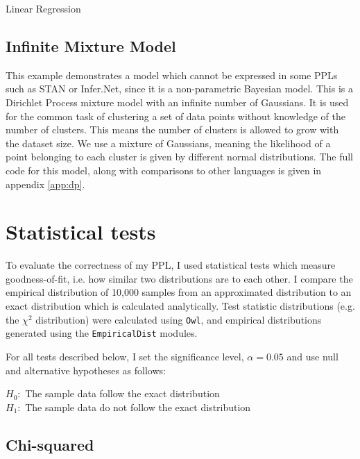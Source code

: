 \begin{listing}[!ht]
	\caption{Linear Regression}
	\label{lst:linreg}
\end{listing}

\subsection{Infinite Mixture Model}
This example demonstrates a model which cannot be expressed in some PPLs such as STAN or Infer.Net, since it is a non-parametric Bayesian model. This is a Dirichlet Process mixture model with an infinite number of Gaussians\cite{dpmm}. It is used for the common task of clustering a set of data points without knowledge of the number of clusters. This means the number of clusters is allowed to grow with the dataset size. We use a mixture of Gaussians, meaning the likelihood of a point belonging to each cluster is given by different normal distributions. The full code for this model, along with comparisons to other languages is given in appendix \ref{app:dp}.


\section{Statistical tests}
To evaluate the correctness of my PPL, I used statistical tests which measure goodness-of-fit, i.e. how similar two distributions are to each other. I compare the empirical distribution of 10,000 samples from an approximated distribution to an exact distribution which is calculated analytically. Test statistic distributions (e.g. the $\chi^2$ distribution) were calculated using \texttt{Owl}, and empirical distributions generated using the \texttt{EmpiricalDist} modules.

For all tests described below, I set the significance level, $\alpha = 0.05$ and use null and alternative hypotheses as follows:

$H_0:$ The sample data follow the exact distribution\\
$H_1:$ The sample data do not follow the exact distribution

\subsection{Chi-squared}

